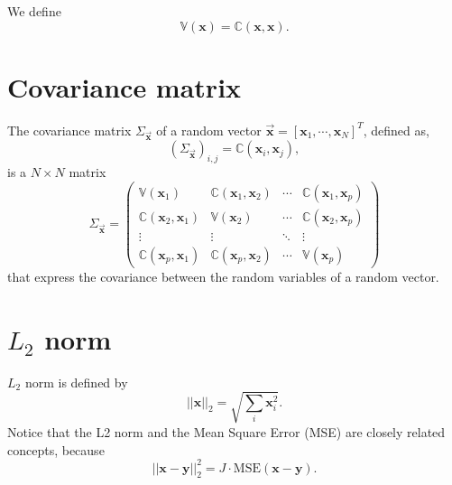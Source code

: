 \documentclass{article}
\begin{document}
We define
\begin{equation}
  \mathbb{V}(\mathbf{x}) = \mathbb{C}(\mathbf{x}, \mathbf{x}).
\end{equation}


\section{Covariance matrix}
\label{sec:covariance_matrix}

The covariance matrix $\Sigma_{\overrightarrow{\mathbf{x}}}$ of a random vector $\overrightarrow{\mathbf{x}}=[\mathbf{x}_1,\cdots,\mathbf{x}_N]^T$, defined as,
\begin{equation}
  (\Sigma_{\overrightarrow{\mathbf{x}}})_{i,j}=\mathbb{C}(\mathbf{x}_i,\mathbf{x}_j),
\end{equation}
is a $N\times N$ matrix
\begin{equation}
\Sigma_{\overrightarrow{\mathbf{x}}} = 
\begin{pmatrix}
\mathbb{V}(\mathbf{x}_1) & \mathbb{C}(\mathbf{x}_1, \mathbf{x}_2) & \cdots & \mathbb{C}(\mathbf{x}_1, \mathbf{x}_p) \\
\mathbb{C}(\mathbf{x}_2, \mathbf{x}_1) & \mathbb{V}(\mathbf{x}_2) & \cdots & \mathbb{C}(\mathbf{x}_2, \mathbf{x}_p) \\
\vdots & \vdots & \ddots & \vdots \\
\mathbb{C}(\mathbf{x}_p, \mathbf{x}_1) & \mathbb{C}(\mathbf{x}_p, \mathbf{x}_2) & \cdots & \mathbb{V}(\mathbf{x}_p)
\end{pmatrix}
\end{equation}
that express the covariance between the random variables of a random vector.


\section{$L_2$ norm}
\label{sec:L2_norm}

$L_2$ norm is defined by
\begin{equation}
  ||\mathbf{x}||_2 = \sqrt{\sum_i\mathbf{x}_i^2}.
\end{equation}
Notice that the L2 norm and the Mean Square Error (MSE) are closely
related concepts, because
\begin{equation}
  ||\mathbf{x} - \mathbf{y}||_2^2 = J\cdot\text{MSE}(\mathbf{x} - \mathbf{y}).
\end{equation}

\end{document}
